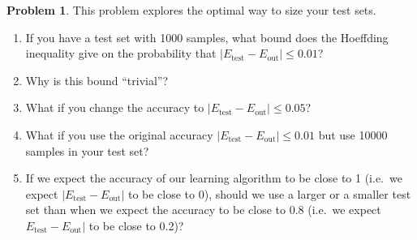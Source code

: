 \documentclass[10pt]{exam}
\theoremstyle{definition}
\newtheorem{problem}{Problem}
\newcommand{\Eout}{E_{\text{out}}}
\newcommand{\Etest}{E_{\text{test}}}
\begin{document}
\newpage
\begin{problem}
    This problem explores the optimal way to size your test sets.
    \begin{enumerate}
        \item If you have a test set with 1000 samples, what bound does the Hoeffding inequality give on the probability that $|\Etest-\Eout| \le 0.01$?
            \vspace{1.5in}

        \item
            Why is this bound ``trivial''?
            \vspace{1.5in}

        \item
            What if you change the accuracy to $|\Etest-\Eout| \le 0.05$?
            \vspace{1.5in}

        \item
            What if you use the original accuracy $|\Etest-\Eout| \le 0.01$ but use 10000 samples in your test set?
            \vspace{1.5in}

        \item
            If we expect the accuracy of our learning algorithm to be close to 1 (i.e.\ we expect $|\Etest-\Eout|$ to be close to 0),
            should we use a larger or a smaller test set than when we expect the accuracy to be close to 0.8 (i.e.\ we expect $\Etest-\Eout|$ to be close to 0.2)?
            \vspace{1.5in}
    \end{enumerate}
\end{problem}
\end{document}
